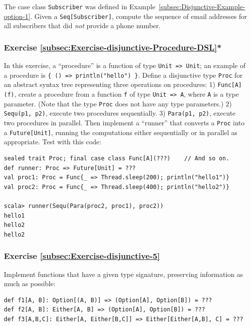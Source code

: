 The case class \lstinline!Subscriber! was defined in Example~\ref{subsec:Disjunctive-Example-option-1}.
Given a \lstinline!Seq[Subscriber]!, compute the sequence of email
addresses for all subscribers that did \emph{not} provide a phone
number.

\subsubsection{Exercise \label{subsec:Exercise-disjunctive-Procedure-DSL}\ref{subsec:Exercise-disjunctive-Procedure-DSL}{*}}

In this exercise, a ``procedure'' is a function
of type \lstinline!Unit => Unit!; an example of a procedure is \lstinline!{ () => println("hello") }!.
Define a disjunctive type \lstinline!Proc! for an abstract syntax
tree representing three operations on procedures: 1) \lstinline!Func[A](f)!,
create a procedure from a function \lstinline!f! of type \lstinline!Unit => A!,
where \lstinline!A! is a type parameter. (Note that the type \lstinline!Proc!
does not have any type parameters.) 2) \lstinline!Sequ(p1, p2)!,
execute two procedures sequentially. 3) \lstinline!Para(p1, p2)!,
execute two procedures in parallel. Then implement a ``runner''
that converts a \lstinline!Proc! into a \lstinline!Future[Unit]!,
running the computations either sequentially or in parallel as appropriate.
Test with this code:
\begin{lstlisting}
sealed trait Proc; final case class Func[A](???)    // And so on.
def runner: Proc => Future[Unit] = ???
val proc1: Proc = Func{_ => Thread.sleep(200); println("hello1")}
val proc2: Proc = Func{_ => Thread.sleep(400); println("hello2")}

scala> runner(Sequ(Para(proc2, proc1), proc2))
hello1
hello2
hello2
\end{lstlisting}


\subsubsection{Exercise \label{subsec:Exercise-disjunctive-5}\ref{subsec:Exercise-disjunctive-5}}

Implement functions that have a given type signature, preserving information
as much as possible: 
\begin{lstlisting}
def f1[A, B]: Option[(A, B)] => (Option[A], Option[B]) = ???
def f2[A, B]: Either[A, B] => (Option[A], Option[B]) = ???
def f3[A,B,C]: Either[A, Either[B,C]] => Either[Either[A,B], C] = ???
\end{lstlisting}


